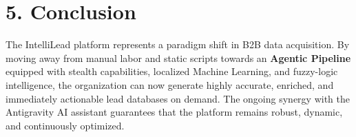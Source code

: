 \documentclass[12pt,a4paper]{article}
\begin{document}
\section{5. Conclusion}

The IntelliLead platform represents a paradigm shift in B2B data acquisition. By moving away from manual labor and static scripts towards an \textbf{Agentic Pipeline} equipped with stealth capabilities, localized Machine Learning, and fuzzy-logic intelligence, the organization can now generate highly accurate, enriched, and immediately actionable lead databases on demand. The ongoing synergy with the Antigravity AI assistant guarantees that the platform remains robust, dynamic, and continuously optimized.
\end{document}
